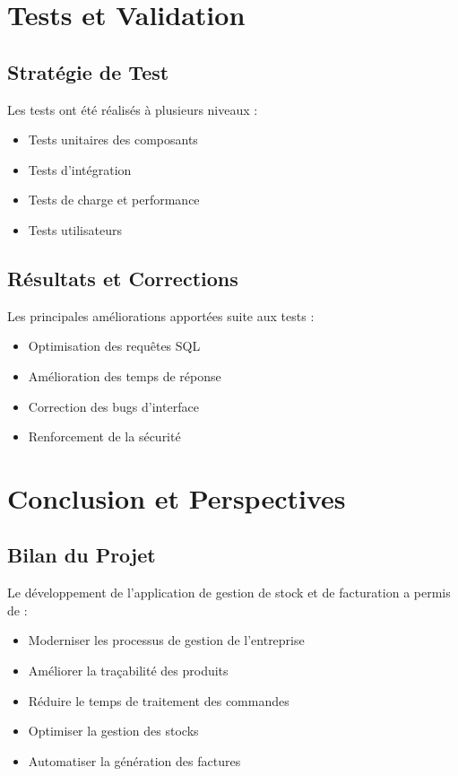\documentclass{report}
\begin{document}
\chapter{Tests et Validation}

\section{Stratégie de Test}
Les tests ont été réalisés à plusieurs niveaux :
\begin{itemize}
    \item Tests unitaires des composants
    \item Tests d'intégration
    \item Tests de charge et performance
    \item Tests utilisateurs
\end{itemize}

\section{Résultats et Corrections}
Les principales améliorations apportées suite aux tests :
\begin{itemize}
    \item Optimisation des requêtes SQL
    \item Amélioration des temps de réponse
    \item Correction des bugs d'interface
    \item Renforcement de la sécurité
\end{itemize}

\chapter{Conclusion et Perspectives}

\section{Bilan du Projet}
Le développement de l'application de gestion de stock et de facturation a permis de :
\begin{itemize}
    \item Moderniser les processus de gestion de l'entreprise
    \item Améliorer la traçabilité des produits
    \item Réduire le temps de traitement des commandes
    \item Optimiser la gestion des stocks
    \item Automatiser la génération des factures
\end{itemize}
\end{document}
